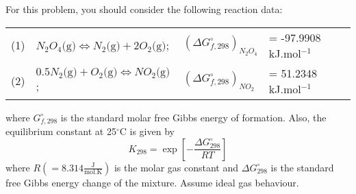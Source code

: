 \documentclass[calculator,allquestions,datasheet,solutions]{exam_newMarcus2}
\newcommand{\frc}{\displaystyle\frac}
\begin{document}
\begin{question}
        For this problem, you should consider the following reaction data:   
       \begin{center}
          \begin{tabular}{c l l l}
             (1) &$N_{2}O_{4}\text{(g)}\Leftrightarrow N_{2}\text{(g)} + 2O_{2}\text{(g)}$; & $\left(\Delta G^{\circ}_{f,298}\right)_{N_{2}O_{4}}$ & =  -97.9908 kJ.mol$^{-1}$  \\
             (2) & $0.5N_{2}\text{(g)}+O_{2}\text{(g)}\Leftrightarrow NO_{2}\text{(g)}$; & $\left(\Delta G^{\circ}_{f,298}\right)_{NO_{2}}$ & = 51.2348 kJ.mol$^{-1}$ 
          \end{tabular}
       \end{center}
          where $G^{\circ}_{f,298}$ is the standard molar free Gibbs energy of formation. Also, the equilibrium constant at 25$^{\circ}$C is given by
          \begin{displaymath}
              K_{298} = \exp{\left[-\frc{\Delta G^{\circ}_{298}}{R T}\right]}
          \end{displaymath}
          where $R\left(=8.314\frc{\text{J}}{\text{mol.K}}\right)$ is the molar gas constant and $\Delta G^{\circ}_{298}$ is the standard free Gibbs energy change of the mixture. Assume ideal gas behaviour.
%
\end{question}

\clearpage
\end{document}

